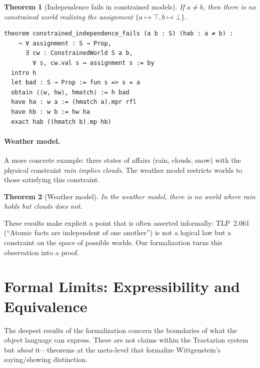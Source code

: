 \documentclass[10pt, letterpaper]{article}
\newtheorem{theorem}{Theorem}[section]
\theoremstyle{definition}
\theoremstyle{remark}
\begin{document}
\begin{theorem}[Independence fails in constrained models]
\label{thm:constrained}
If $a \neq b$, then there is no constrained world realizing the
assignment $\{a \mapsto \top, b \mapsto \bot\}$.
\end{theorem}

\begin{lstlisting}
theorem constrained_independence_fails (a b : S) (hab : a ≠ b) :
    ¬ ∀ assignment : S → Prop,
      ∃ cw : ConstrainedWorld S a b,
        ∀ s, cw.val s ↔ assignment s := by
  intro h
  let bad : S → Prop := fun s => s = a
  obtain ⟨⟨w, hw⟩, hmatch⟩ := h bad
  have ha : w a := (hmatch a).mpr rfl
  have hb : w b := hw ha
  exact hab ((hmatch b).mp hb)
\end{lstlisting}

\paragraph{Weather model.}
A more concrete example: three states of affairs (rain, clouds,
snow) with the physical constraint \emph{rain implies clouds}.
The weather model restricts worlds to those satisfying this
constraint.

\begin{theorem}[Weather model]
\label{thm:weather}
In the weather model, there is no world where rain holds but
clouds does not.
\end{theorem}

\noindent
These results make explicit a point that is often asserted
informally: TLP~2.061 (``Atomic facts are independent of one
another'') is not a logical law but a constraint on the space of
possible worlds.  Our formalization turns this observation into a
proof.

\section{Formal Limits: Expressibility and Equivalence}
\label{sec:limits}

The deepest results of the formalization concern the boundaries
of what the object language can express.  These are not claims
within the Tractarian system but \emph{about} it---theorems at
the meta-level that formalize Wittgenstein's saying/showing
distinction.

\end{document}
